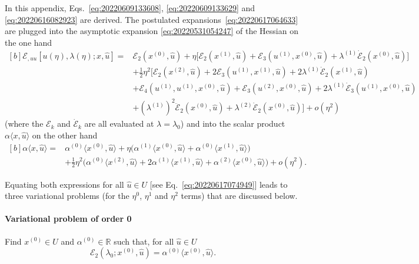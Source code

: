 \documentclass[12pt, final]{scrartcl}
\theoremstyle{definition}
\newcommand{\E}{\mathcal E}
\newcommand{\order}[2][1]{#2^{(#1)}}
\newcommand{\reals}{\mathbb{R}}
\begin{document}
In this appendix, Eqs.~\eqref{eq:20220609133608}, \eqref{eq:20220609133629} and \eqref{eq:20220616082923} are
derived. The postulated expansions~\eqref{eq:20220617064633} are plugged into the asymptotic expansion
\eqref{eq:20220531054247} of the Hessian on the one hand
\begin{equation*}
  \begin{aligned}[b]
    \E_{, uu} [u(\eta), \lambda(\eta); x, \hat{u}] ={}
    & \E_2(\order[0]x, \hat{u}) + \eta \bigl[ \E_2(\order[1]x, \hat{u}) + \E_3(\order[1]u, \order[0]x, \hat{u}) + \order[1]\lambda \dot{\E}_2(\order[0]x, \hat{u})\bigr]\\
    & + \tfrac{1}{2} \eta^2 \bigl[\E_2(\order[2]x, \hat{u}) + 2\E_3(\order[1]u, \order[1]x, \hat{u}) + 2 \order[1]\lambda \dot{\E}_2(\order[1]x, \hat{u})\\
    & + \E_4(\order[1]u, \order[1]u, \order[0]x, \hat{u}) + \E_3(\order[2]u, \order[0]x, \hat{u}) + 2\order[1]\lambda \dot{\E}_3(\order[1]u, \order[0]x, \hat{u})\\
    & + ( \order[1]\lambda )^2 \ddot{\E}_2(\order[0]x, \hat{u}) + \order[2]\lambda \dot{\E}_2(\order[0]x, \hat{u}) \bigr] + o(\eta^2)
  \end{aligned}
\end{equation*}
(where the $\E_k$ and $\dot{\E}_k$ are all evaluated at $\lambda=\lambda_0$) and into the scalar product
$\alpha \langle x, \hat{u} \rangle$ on the other hand
\begin{equation*}
  \begin{aligned}[b]
    \alpha \langle x, \hat{u} \rangle ={}
    & \order[0]\alpha \langle \order[0]x, \hat{u} \rangle + \eta \bigl(\order[1]\alpha \langle \order[0]x, \hat{u} \rangle + \order[0]\alpha \langle \order[1]x, \hat{u} \rangle\bigr)\\
    & + \tfrac{1}{2} \eta^2 \bigl(\order[0]\alpha \langle \order[2]x, \hat{u} \rangle + 2 \order[1]\alpha \langle \order[1]x, \hat{u} \rangle + \order[2]\alpha \langle \order[0]x, \hat{u} \rangle\bigr) + o(\eta^2).
  \end{aligned}
\end{equation*}

Equating both expressions for all $\hat{u} \in U$ [see Eq.~\eqref{eq:20220617074949}] leads to three variational
problems (for the $\eta^0$, $\eta^1$ and $\eta^2$ terms) that are discussed below.

\paragraph{Variational problem of order 0} Find $\order[0]x \in U$ and $\order[0]\alpha\in\reals$ such
that, for all $\hat{u} \in U$
\begin{equation*}
  \E_2(\lambda_0; \order[0]x, \hat{u}) = \order[0]\alpha \langle \order[0]x, \hat{u} \rangle.
\end{equation*}
\end{document}
